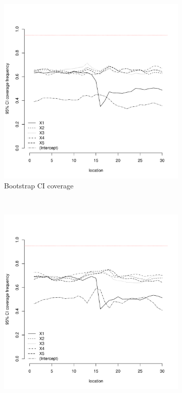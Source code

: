 \documentclass[authoryear, review, 11pt]{elsarticle}
\begin{document}
\begin{figure}
	\vspace{-30mm}
	\centering
	\begin{subfigure}[b]{0.45\textwidth}
	\centering
		\includegraphics[width=\textwidth]{../../figures/simulation/15.35.profile_bootstrap_coverage.pdf}
		\caption{Bootstrap CI coverage}
	\end{subfigure}%
	~ %
	\begin{subfigure}[b]{0.45\textwidth}
	\centering
		\includegraphics[width=\textwidth]{../../figures/simulation/15.35.profile_se_coverage.pdf}

\end{subfigure}
\end{figure}
\end{document}
